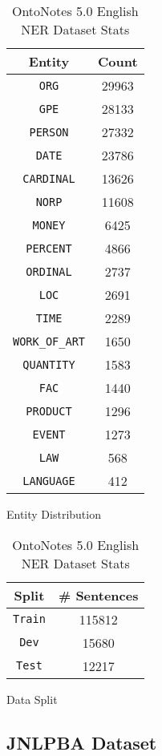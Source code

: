 \begin{table}[h!]
\begin{subtable}[t]{.48\linewidth}
\centering
\begin{tabular}{|c|c|}\hline
	\textbf{Entity} & \textbf{Count}\\\hline
	\texttt{ORG} & 29963\\\hline
    \texttt{GPE} & 28133\\\hline
    \texttt{PERSON} & 27332\\\hline
    \texttt{DATE} & 23786\\\hline
    \texttt{CARDINAL} & 13626\\\hline
    \texttt{NORP} & 11608\\\hline
    \texttt{MONEY} & 6425\\\hline
    \texttt{PERCENT} & 4866\\\hline
    \texttt{ORDINAL} & 2737\\\hline
    \texttt{LOC} & 2691\\\hline
    \texttt{TIME} & 2289\\\hline
    \texttt{WORK\_OF\_ART} & 1650\\\hline
    \texttt{QUANTITY} & 1583\\\hline
    \texttt{FAC} & 1440\\\hline
    \texttt{PRODUCT} & 1296\\\hline
    \texttt{EVENT} & 1273\\\hline
    \texttt{LAW} & 568\\\hline
    \texttt{LANGUAGE} & 412\\\hline
	\end{tabular}
	\caption{Entity Distribution}
	\label{tab:onto_entity_distribution}
\end{subtable}
\begin{subtable}[t]{.48\linewidth}
\centering
\begin{tabular}{|c|c|}\hline
	\textbf{Split} & \textbf{\# Sentences}\\\hline
	\texttt{Train} & 115812\\\hline
	\texttt{Dev} & 15680\\\hline
	\texttt{Test} & 12217\\\hline
	\end{tabular}
	\caption{Data Split}
	\label{tab:onto_dataset_split}
\end{subtable}
\caption{OntoNotes 5.0 English NER Dataset Stats}
\end{table}

\subsection{JNLPBA Dataset}

